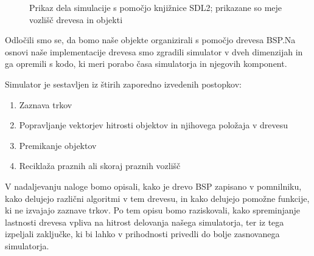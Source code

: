 \documentclass[a4paper,12pt]{article}
\begin{document}
\begin{figure}
    \centering
    \caption{Prikaz dela simulacije s pomočjo knjižnice SDL2; prikazane so meje vozlišč drevesa in objekti}
\end{figure}



Odločili smo se, da bomo naše objekte organizirali s pomočjo drevesa BSP.\@ Na osnovi naše implementacije drevesa
smo zgradili simulator v dveh dimenzijah in ga opremili s kodo, ki meri porabo časa simulatorja in njegovih
komponent.

Simulator je sestavljen iz štirih zaporedno izvedenih postopkov:
\begin{enumerate}
    \item Zaznava trkov
    \item Popravljanje vektorjev hitrosti objektov in njihovega položaja v drevesu
    \item Premikanje objektov
    \item Reciklaža praznih ali skoraj praznih vozlišč
\end{enumerate}

V nadaljevanju naloge bomo opisali, kako je drevo BSP zapisano v pomnilniku, kako delujejo različni
algoritmi v tem drevesu, in kako delujejo pomožne funkcije, ki ne izvajajo zaznave trkov. Po tem opisu
bomo raziskovali, kako spreminjanje lastnosti drevesa vpliva na hitrost delovanja našega simulatorja,
ter iz tega izpeljali zaključke, ki bi lahko v prihodnosti privedli do bolje zasnovanega simulatorja.
\end{document}
